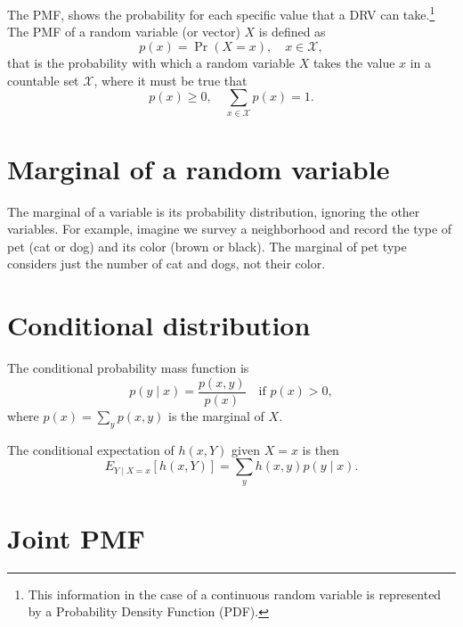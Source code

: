 \section{} %

The \gls{PMF}, shows the probability for each specific value that a
\gls{DRV} can take.\footnote{This information in the case of a
  continuous random variable is represented by a Probability Density
  Function (PDF).} The \gls{PMF} of a random variable (or vector) $X$
is defined as
\begin{equation}
  p(x) = \Pr(X=x), \quad x\in\mathcal{X},
\end{equation}
that is the probability with which a random variable $X$ takes
the value $x$ in a countable set $\mathcal{X}$, where it must be true that
\begin{equation*}
  p(x)\ge 0,\quad\sum_{x\in\mathcal{X}}p(x)=1.
\end{equation*}


\section{Marginal of a random variable}

The marginal of a variable is its probability distribution, ignoring
the other variables. For example, imagine we survey a neighborhood and
record the type of pet (cat or dog) and its color (brown or
black). The marginal of pet type considers just the number of cat and
dogs, not their color.


\section{Conditional distribution}

The conditional probability mass function is
$$ p(y \mid x) = \frac{p(x,y)}{p(x)} \quad \text{if } p(x) > 0, $$
where $p(x) = \sum_{y} p(x,y)$ is the marginal of $X$.

The conditional expectation of $h(x,Y)$ given $X=x$ is then
$$ E_{Y \mid X=x}[h(x,Y)] = \sum_{y} h(x,y) p(y \mid x). $$


\section{Joint \gls{PMF}} %

